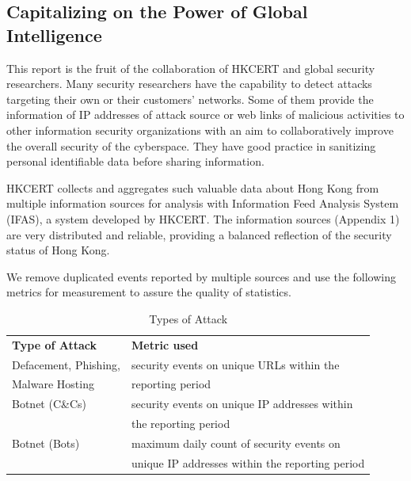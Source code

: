 \documentclass[12pt]{article}
\begin{document}
\subsection*{Capitalizing on the Power of Global Intelligence}

This report is the fruit of the collaboration of HKCERT and global security researchers. Many security researchers have the capability to detect attacks targeting their own or their customers’ networks. Some of them provide the information of IP addresses of attack source or web links of malicious activities to other information security organizations with an aim to collaboratively improve the overall security of the cyberspace. They have good practice in sanitizing personal identifiable data before sharing information.

HKCERT collects and aggregates such valuable data about Hong Kong from multiple information sources for analysis with Information Feed Analysis System (IFAS), a system developed by HKCERT. The information sources (Appendix 1) are very distributed and reliable, providing a balanced reflection of the security status of Hong Kong.

We remove duplicated events reported by multiple sources and use the following metrics for measurement to assure the quality of statistics.

\begin{table}[b]
\centering
\caption{Types of Attack}
\begin{tabular}{ll}
\hline
\textbf{ Type of Attack}              & \textbf{ Metric used}                                                                         \\\hhline{==}
Defacement, Phishing,                 & security events on unique URLs within the             \\
Malware Hosting                       & reporting period\\\hline
Botnet (C\&Cs)                        & security events on unique IP addresses within    \\
                                      & the reporting period \\\hline
Botnet (Bots)                         & maximum daily count of security events on  \\
                                      & unique IP addresses within the reporting period \\\hline
\end{tabular}

\end{table}
\end{document}
